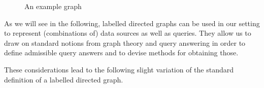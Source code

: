 \begin{figure}
  \caption{An example graph}
  \label{fig:example_graph}
\end{figure}

As we will see in the following, labelled directed graphs can be used in our setting
to represent (combinations of) data sources as well as queries.
They allow us to draw on standard notions from graph theory and query answering
in order to define admissible query answers and to devise methods for obtaining those.

These considerations lead to the following slight variation
of the standard definition of a labelled directed graph.

%
